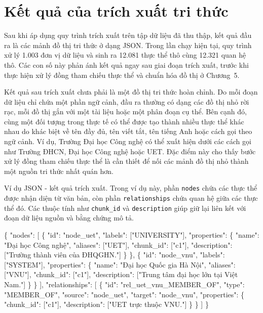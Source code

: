 \section{Kết quả của trích xuất tri thức}

Sau khi áp dụng quy trình trích xuất trên tập dữ liệu đã thu thập, kết quả đầu ra là các mảnh đồ thị tri thức ở dạng JSON. Trong lần chạy hiện tại, quy trình xử lý 1.003 đơn vị dữ liệu và sinh ra 12.081 thực thể thô cùng 12.321 quan hệ thô. Các con số này phản ánh kết quả ngay sau giai đoạn trích xuất, trước khi thực hiện xử lý đồng tham chiếu thực thể và chuẩn hóa đồ thị ở Chương~5.

Kết quả sau trích xuất chưa phải là một đồ thị tri thức hoàn chỉnh. Do mỗi đoạn dữ liệu chỉ chứa một phần ngữ cảnh, đầu ra thường có dạng các đồ thị nhỏ rời rạc, mỗi đồ thị gắn với một tài liệu hoặc một phân đoạn cụ thể. Bên cạnh đó, cùng một đối tượng trong thực tế có thể được tạo thành nhiều thực thể khác nhau do khác biệt về tên đầy đủ, tên viết tắt, tên tiếng Anh hoặc cách gọi theo ngữ cảnh. Ví dụ, Trường Đại học Công nghệ có thể xuất hiện dưới các cách gọi như Trường ĐHCN, Đại học Công nghệ hoặc UET. Đặc điểm này cho thấy bước xử lý đồng tham chiếu thực thể là cần thiết để nối các mảnh đồ thị nhỏ thành một nguồn tri thức nhất quán hơn.

Ví dụ JSON - kết quả trích xuất. Trong ví dụ này, phần \texttt{nodes} chứa các thực thể được nhận diện từ văn bản, còn phần \texttt{relationships} chứa quan hệ giữa các thực thể đó. Các thuộc tính như \texttt{chunk\_id} và \texttt{description} giúp giữ lại liên kết với đoạn dữ liệu nguồn và bằng chứng mô tả.

\begin{jsonbox}
\{
  "nodes": [
    \{
      "id": "node\_uet",
      "labels": ["UNIVERSITY"],
      "properties": \{
        "name": "Đại học Công nghệ",
        "aliases": ["UET"],
        "chunk\_id": ["c1"],
        "description": ["Trường thành viên của ĐHQGHN."]
      \}
    \},
    \{
      "id": "node\_vnu",
      "labels": ["SYSTEM"],
      "properties": \{
        "name": "Đại học Quốc gia Hà Nội",
        "aliases": ["VNU"],
        "chunk\_id": ["c1"],
        "description": ["Trung tâm đại học lớn tại Việt Nam."]
      \}
    \}
  ],
  "relationships": [
    \{
      "id": "rel\_uet\_vnu\_MEMBER\_OF",
      "type": "MEMBER\_OF",
      "source": "node\_uet",
      "target": "node\_vnu",
      "properties": \{
        "chunk\_id": ["c1"],
        "description": ["UET trực thuộc VNU."]
      \}
    \}
  ]
\}
\end{jsonbox}

